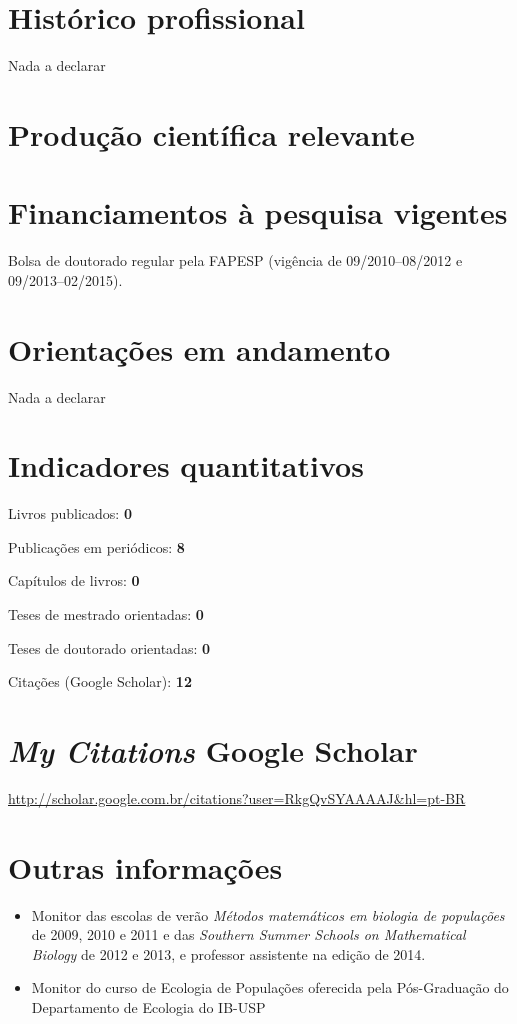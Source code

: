\documentclass[a4paper ,11pt]{article}
\renewenvironment{enumerate}{
  \begin{list}{}{
    \setlength{\leftmargin}{2em}
  }
}{
  \end{list}
}
\begin{document}
\section{Histórico profissional}
Nada a declarar

\section{Produção científica relevante}

\renewcommand{\refname}{Artigos}

\nocite{*}



\section{Financiamentos à pesquisa vigentes}

Bolsa de doutorado regular pela FAPESP (vigência de 09/2010--08/2012 e 09/2013--02/2015).

\section{Orientações em andamento}
Nada a declarar

\section{Indicadores quantitativos}
\begin{enumerate}
    \item Livros publicados: \textbf{0}
    \item Publicações em periódicos: \textbf{8}
    \item Capítulos de livros: \textbf{0}
    \item Teses de mestrado orientadas: \textbf{0}
    \item Teses de doutorado orientadas: \textbf{0}
    \item Citações (Google Scholar): \textbf{12}
\end{enumerate}

\section{\emph{My Citations} Google Scholar}
\url{http://scholar.google.com.br/citations?user=RkgQvSYAAAAJ&hl=pt-BR}

\section{Outras informações}
\begin{itemize}
    \item Monitor das escolas de verão \emph{Métodos matemáticos em biologia de
populações} de 2009, 2010 e 2011 e das \emph{Southern Summer Schools on Mathematical
Biology} de 2012 e 2013, e professor assistente na edição de 2014.
    \item Monitor do curso de Ecologia de Populações oferecida pela Pós-Graduação do Departamento de
Ecologia do IB-USP
\end{itemize}
\end{document}
